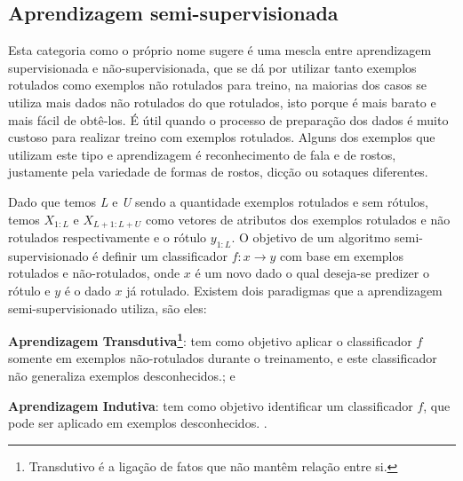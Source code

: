 \subsection{Aprendizagem semi-supervisionada}
\label{subsec:semi-supervised-learning}
Esta categoria como o próprio nome sugere é uma mescla entre aprendizagem supervisionada e não-supervisionada, 
que se dá por utilizar tanto exemplos rotulados como exemplos não rotulados para treino, na maiorias dos casos se utiliza 
mais dados não rotulados do que rotulados, isto porque é mais barato e mais fácil de obtê-los. É útil quando o processo de preparação
dos dados é muito custoso para realizar treino com exemplos  rotulados.
Alguns dos exemplos que utilizam este tipo e aprendizagem é reconhecimento de fala e de rostos, justamente pela variedade
de formas de rostos, dicção ou sotaques diferentes.

Dado que temos \textit{L} e \textit{U} sendo a quantidade exemplos rotulados e sem rótulos, temos $X_{1:L}$ e $X_{L+1: L+U}$ como vetores de atributos dos exemplos
rotulados e não rotulados respectivamente e o rótulo $y_{1:L}$.  O objetivo de um algoritmo semi-supervisionado é definir 
um classificador $f : x \rightarrow y$ com base em exemplos rotulados e não-rotulados, onde $x$ é um novo dado o qual deseja-se predizer o rótulo e $y$ é o dado $x$ já rotulado.
 Existem dois paradigmas que a aprendizagem
semi-supervisionado utiliza, são eles:

\begin{alineas}
	\item \textbf{Aprendizagem Transdutiva\footnote{Transdutivo é a ligação de fatos que não mantêm relação entre si.}}: tem como objetivo aplicar o classificador $f$ somente em exemplos 
	não-rotulados durante o treinamento, e este classificador não generaliza exemplos desconhecidos.\cite{Zhu03semi-supervisedlearning,Zhou04learningwith}; e
	\item \textbf{Aprendizagem Indutiva}: tem como objetivo identificar um classificador $f$, que pode ser aplicado em exemplos desconhecidos.
	\cite{indutive-learning}. 
\end{alineas} 